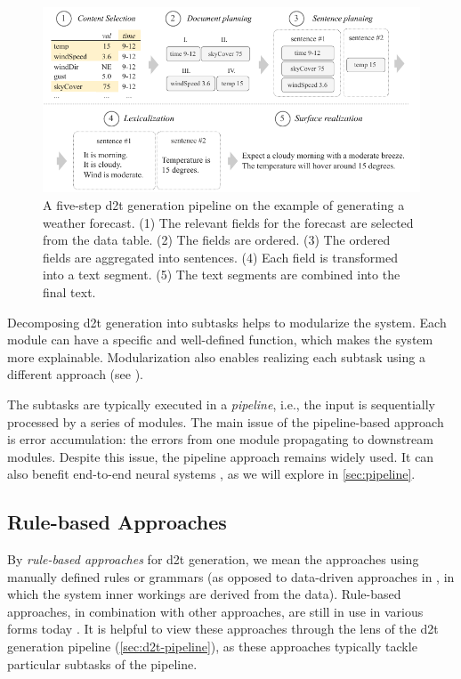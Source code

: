 {\begin{figure}[t]
    \centering
    \includegraphics[width=\textwidth]{img/pipeline.pdf}

    \caption{A five-step \ac{d2t} generation pipeline on the example of generating a weather forecast. (1) The relevant fields for the forecast are selected from the data table. (2) The fields are ordered. (3) The ordered fields are aggregated into sentences. (4) Each field is transformed into a text segment. (5) The text segments are combined into the final text.}\label{fig:pipeline}

\end{figure}


Decomposing \ac{d2t} generation into subtasks helps to modularize the system. Each module can have a specific and well-defined function, which makes the system more explainable. Modularization also enables realizing each subtask using a different approach (see ).

The subtasks are typically executed in a \emph{pipeline}, i.e., the input is sequentially processed by a series of modules. The main issue of the pipeline-based approach is error accumulation: the errors from one module propagating to downstream modules. Despite this issue, the pipeline approach remains widely used. It can also benefit end-to-end neural systems \cite{ferreiraNeuralDatatotextGeneration2019}, as we will explore in \autoref{sec:pipeline}.


\subsection{Rule-based Approaches}
\label{sec:rule-d2t}

By \emph{rule-based approaches} for \ac{d2t} generation, we mean the approaches using manually defined rules or grammars (as opposed to data-driven approaches in , in which the system inner workings are derived from the data). Rule-based approaches, in combination with other approaches, are still in use in various forms today \cite{gattSurveyStateArt2018,daleNaturalLanguageGeneration2020,daleNavigatingTextGeneration2023}. It is helpful to view these approaches through the lens of the \ac{d2t} generation pipeline (\autoref{sec:d2t-pipeline}), as these approaches typically tackle particular subtasks of the pipeline.


}
